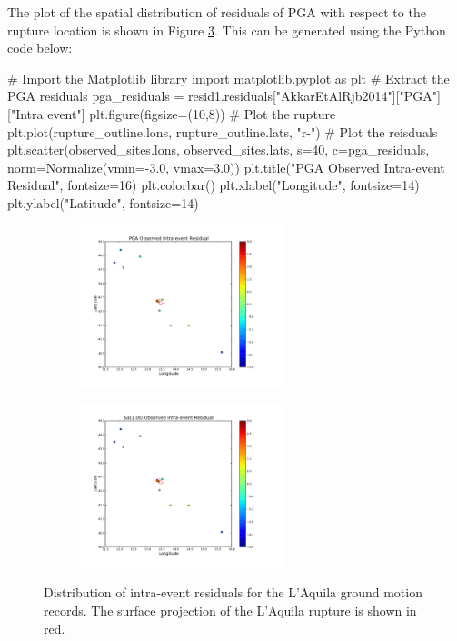 The plot of the spatial distribution of residuals of PGA with respect to the rupture location is shown in Figure \ref{fig:laquila_spatial_resid}. This can be generated using the Python code below:

\begin{python}[frame=single]
# Import the Matplotlib library
import matplotlib.pyplot as plt
# Extract the PGA residuals
pga_residuals = resid1.residuals["AkkarEtAlRjb2014"]["PGA"]["Intra event"]
plt.figure(figsize=(10,8))
# Plot the rupture
plt.plot(rupture_outline.lons, rupture_outline.lats, "r-")
# Plot the reisduals
plt.scatter(observed_sites.lons, observed_sites.lats, 
            s=40,
            c=pga_residuals, 
            norm=Normalize(vmin=-3.0, vmax=3.0))
plt.title("PGA Observed Intra-event Residual", fontsize=16)
plt.colorbar()
plt.xlabel("Longitude", fontsize=14)
plt.ylabel("Latitude", fontsize=14)
\end{python}

\begin{figure}[htb]
  \centering
  \begin{subfigure}[b]{\textwidth}
      \includegraphics[trim=14mm 14mm 14mm 14mm, clip, width=0.65\textwidth]{./figures/hazard/LAquila_Observed_IntraEvent_Resid.pdf}
      \label{fig:laquila_spatial_resid_pga}
  \end{subfigure}
    \begin{subfigure}[b]{\textwidth}
      \includegraphics[trim=14mm 14mm 14mm 14mm, clip, width=0.65\textwidth]{./figures/hazard/LAquila_Observed_IntraEvent_Resid_sa1.pdf}
      \label{fig:laquila_spatial_resid_sa1}
  \end{subfigure}
  \caption{Distribution of intra-event residuals for the L'Aquila ground motion records. The surface projection of the L'Aquila rupture is shown in red.}
  \label{fig:laquila_spatial_resid}
\end{figure}

